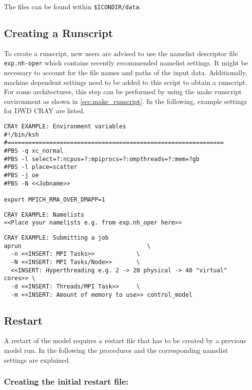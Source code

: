 The files can be found within \verb+$ICONDIR/data+.

\subsection{Creating a Runscript}

To create a runscript, new users are advised to use the namelist descriptor file \verb+exp.nh-oper+ which contains recently recommended namelist settings. It might be necessary to account for the file names and paths of the input data. Additionally, machine dependent settings need to be added to this script to obtain a runscript. For some architectures, this step can be performed by using the make runscript environment as shown in \ref{sec:make_runscript}. In the following, example settings for DWD CRAY are listed.

\begin{Verbatim}[frame=single]
CRAY EXAMPLE: Environment variables
#!/bin/ksh
#==============================================================
#PBS -q xc_normal
#PBS -l select=?:ncpus=?:mpiprocs=?:ompthreads=?:mem=?gb
#PBS -l place=scatter
#PBS -j oe
#PBS -N <<Jobname>>

export MPICH_RMA_OVER_DMAPP=1
\end{Verbatim}

\begin{Verbatim}[frame=single]
CRAY EXAMPLE: Namelists
<<Place your namelists e.g. from exp.nh_oper here>>
\end{Verbatim}

\begin{Verbatim}[frame=single]
CRAY EXAMPLE: Submitting a job
aprun                                    \
  -n <<INSERT: MPI Tasks>>            \
  -N <<INSERT: MPI Tasks/Node>>       \
  <<INSERT: Hyperthreading e.g. 2 -> 20 physical -> 40 "virtual" cores>> \
  -d <<INSERT: Threads/MPI Task>>     \
  -m <<INSERT: Amount of memory to use>> control_model
\end{Verbatim}


\subsection{Restart}

A restart of the model requires a restart file that has to be created by a 
previous model run. In the following the procedures and the corresponding namelist settings are explained.

\subsubsection{Creating the initial restart file:}

